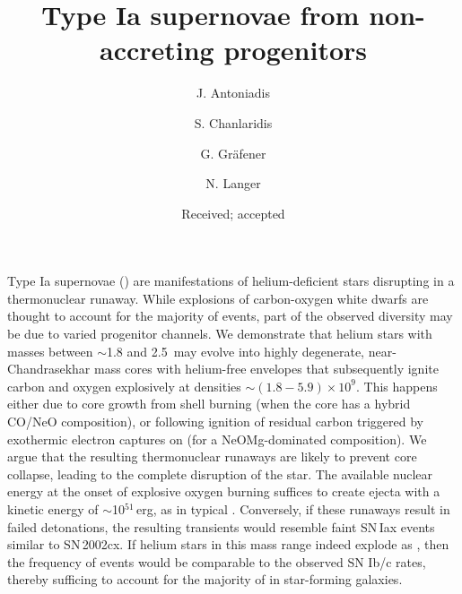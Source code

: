 \documentclass[twocolumn]{aa}
\begin{document}
\title{Type Ia supernovae from non-accreting progenitors}
 


   \author{J. Antoniadis 
   \and S. Chanlaridis 
   \and G. Gr\"{a}fener
   \and N. Langer
          }


   \date{Received; accepted}





\abstract 
{Type Ia supernovae (\ias) are  manifestations of helium-deficient stars disrupting in a 
thermonuclear runaway. While explosions of carbon-oxygen white dwarfs are 
thought to account for the majority of events, part of the observed diversity 
may be due to varied progenitor channels. We demonstrate that 
helium stars with masses between $\sim$1.8 and 2.5\msun\ may evolve 
into highly degenerate, near-Chandrasekhar mass cores with 
helium-free envelopes that subsequently  ignite carbon and oxygen explosively at densities $\sim(1.8-5.9)\times 10^{9}$\denu. This happens either due to core growth from 
shell burning (when the core has a hybrid CO/NeO composition), 
or following ignition of residual carbon triggered by  
exothermic electron captures on  (for a 
NeOMg-dominated  composition).
 We argue that the resulting 
thermonuclear runaways are likely to prevent core collapse, leading to the complete disruption of the star.
 The available nuclear energy at the onset of 
 explosive oxygen burning suffices to create 
 ejecta with a kinetic energy of $\sim$10$^{51}$\,erg, as in typical \ias. 
 Conversely, if these  runaways  result in failed detonations, the resulting transients would resemble faint 
 SN\,Iax events similar to SN\,2002cx. 
If helium stars in this mass range indeed explode as \ias, then the frequency of events would be comparable to the observed SN Ib/c rates, thereby sufficing to account for the majority of \ias in star-forming galaxies.}



\maketitle
\end{document}
